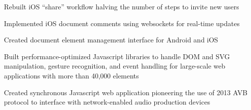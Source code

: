 \documentclass[letterpaper]{deedy-resume} %
\begin{document}
\begin{minipage}[t]{0.66\textwidth}

\begin{tightitemize}
  \item Rebuilt iOS ``share'' workflow halving the number of steps to invite new users
  \item Implemented iOS document comments using websockets for real-time updates
  \item Created document element management interface for Android and iOS
\end{tightitemize}

\sectionspace %



\begin{tightitemize}
  \item Built performance-optimized Javascript libraries to handle DOM and SVG manipulation, gesture recognition, and event handling for large-scale web applications with more than 40,000 elements
  \item Created synchronous Javascript web application pioneering the use of 2013 AVB protocol to interface with network-enabled audio production devices
\end{tightitemize}

\sectionspace %









\end{minipage}
\end{document}
